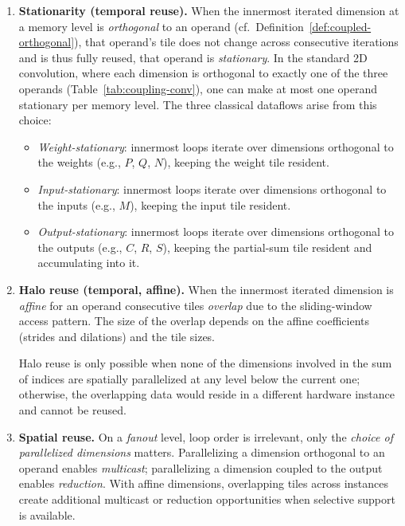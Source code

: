 \begin{enumerate}
  \item \textbf{Stationarity (temporal reuse).}
    When the innermost iterated dimension at a memory level is
    \emph{orthogonal} to an operand
    (cf.~Definition~\ref{def:coupled-orthogonal}), that operand's tile
    does not change across consecutive iterations and is thus fully
    reused, that operand is \emph{stationary}.
    In the standard 2D convolution, where each dimension is orthogonal
    to exactly one of the three operands (Table~\ref{tab:coupling-conv}),
    one can make at most one operand stationary per memory level.
    The three classical dataflows arise from this choice:
    \begin{itemize}
      \item \emph{Weight-stationary}: innermost loops iterate over
        dimensions orthogonal to the weights (e.g., $P$, $Q$, $N$),
        keeping the weight tile resident.
      \item \emph{Input-stationary}: innermost loops iterate over
        dimensions orthogonal to the inputs (e.g., $M$), keeping the
        input tile resident.
      \item \emph{Output-stationary}: innermost loops iterate over
        dimensions orthogonal to the outputs (e.g., $C$, $R$, $S$),
        keeping the partial-sum tile resident and accumulating into it.
    \end{itemize}

  \item \textbf{Halo reuse (temporal, affine).}
    When the innermost iterated dimension is \emph{affine} for an
    operand consecutive tiles
    \emph{overlap} due to the sliding-window access pattern.
    The size of the overlap depends on the affine coefficients (strides
    and dilations) and the tile sizes.

    Halo reuse is only possible when none of the dimensions involved in
    the sum of indices are spatially parallelized at any level below
    the current one; otherwise, the overlapping data would reside in a
    different hardware instance and cannot be reused.

  \item \textbf{Spatial reuse.}
    On a \emph{fanout} level, loop order is irrelevant, only the
    \emph{choice of parallelized dimensions} matters.
    Parallelizing a dimension orthogonal to an operand enables
    \emph{multicast}; parallelizing a dimension coupled to the output
    enables \emph{reduction}.
    With affine dimensions, overlapping tiles across instances create
    additional multicast or reduction opportunities when selective
    support is available.
\end{enumerate}


